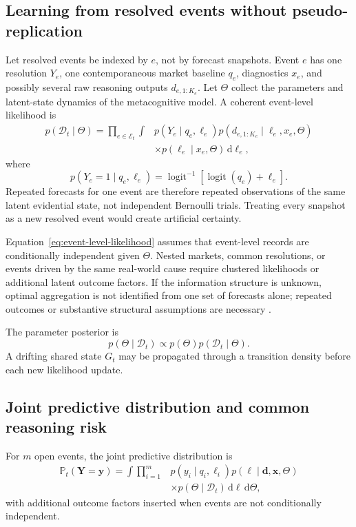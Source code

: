 \documentclass[journal,a4paper]{IEEEtran}
\newcommand{\Prb}{\mathbb{P}}
\newcommand{\sigmoid}{\operatorname{logit}^{-1}}
\newcommand{\logit}{\operatorname{logit}}
\begin{document}
\subsection{Learning from resolved events without pseudo-replication}
Let resolved events be indexed by $e$, not by forecast snapshots. Event $e$ has one resolution $Y_e$, one contemporaneous market baseline $q_e$, diagnostics $x_e$, and possibly several raw reasoning outputs $d_{e,1:K_e}$. Let $\Theta$ collect the parameters and latent-state dynamics of the metacognitive model. A coherent event-level likelihood is
\begin{equation}
\begin{split}
p(\mathcal{D}_t\mid\Theta)
=
\prod_{e\in\mathcal{E}_t}
\int &
 p\!\left(Y_e\mid q_e,\ell_e\right)
 p\!\left(d_{e,1:K_e}\mid\ell_e,x_e,\Theta\right)\\
&\times p(\ell_e\mid x_e,\Theta)\,\mathrm{d}\ell_e,
\end{split}
\label{eq:event-level-likelihood}
\end{equation}
where
\begin{equation}
p(Y_e=1\mid q_e,\ell_e)
=
\sigmoid[\logit(q_e)+\ell_e].
\end{equation}
Repeated forecasts for one event are therefore repeated observations of the same latent evidential state, not independent Bernoulli trials. Treating every snapshot as a new resolved event would create artificial certainty.

Equation~\eqref{eq:event-level-likelihood} assumes that event-level records are conditionally independent given $\Theta$. Nested markets, common resolutions, or events driven by the same real-world cause require clustered likelihoods or additional latent outcome factors. If the information structure is unknown, optimal aggregation is not identified from one set of forecasts alone; repeated outcomes or substantive structural assumptions are necessary \cite{babichenko2018}.

The parameter posterior is
\begin{equation}
p(\Theta\mid\mathcal{D}_t)
\propto
p(\Theta)p(\mathcal{D}_t\mid\Theta).
\label{eq:theta-posterior}
\end{equation}
A drifting shared state $G_t$ may be propagated through a transition density before each new likelihood update.

\subsection{Joint predictive distribution and common reasoning risk}
For $m$ open events, the joint predictive distribution is
\begin{equation}
\begin{split}
\Prb_t(\boldsymbol{Y}=\boldsymbol{y})
=
\int
\prod_{i=1}^{m}
&p(y_i\mid q_i,\ell_i)
 p(\boldsymbol{\ell}\mid\boldsymbol{d},\boldsymbol{x},\Theta)\\
&\times p(\Theta\mid\mathcal{D}_t)
\,\mathrm{d}\boldsymbol{\ell}\,\mathrm{d}\Theta,
\end{split}
\label{eq:joint-meta-predictive}
\end{equation}
with additional outcome factors inserted when events are not conditionally independent.
\end{document}
